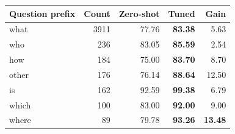 \begin{tabular}{lrrrr}
\toprule
Question prefix & Count & Zero-shot & Tuned & Gain\\
\midrule
what & 3911 & 77.76 & \textbf{83.38} & 5.63\\
who & 236 & 83.05 & \textbf{85.59} & 2.54\\
how & 184 & 75.00 & \textbf{83.70} & 8.70\\
other & 176 & 76.14 & \textbf{88.64} & 12.50\\
is & 162 & 92.59 & \textbf{99.38} & 6.79\\
which & 100 & 83.00 & \textbf{92.00} & 9.00\\
where & 89 & 79.78 & \textbf{93.26} & \textbf{13.48}\\
\bottomrule
\end{tabular}

